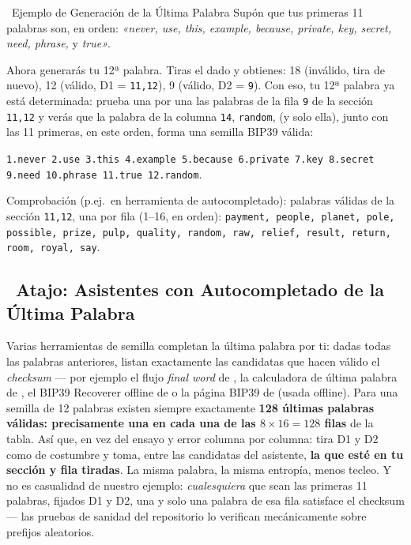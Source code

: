 \documentclass[10pt]{article}
\begin{document}
\begin{examplebox}{\faLightbulb~Ejemplo de Generación de la Última Palabra}
Supón que tus primeras 11 palabras son, en orden: \textit{«never, use, this, example, because, private, key, secret, need, phrase,} y \textit{true»}.

Ahora generarás tu 12ª palabra. Tiras el dado y obtienes: 18 (inválido, tira de nuevo), 12 (válido, D1 = \texttt{11,12}), 9 (válido, D2 = \texttt{9}). Con eso, tu 12ª palabra ya está determinada: prueba una por una las palabras de la fila \texttt{9} de la sección \texttt{11,12} y verás que la palabra de la columna \texttt{14}, \texttt{random}, (y solo ella), junto con las 11 primeras, en este orden, forma una semilla BIP39 válida:

\vspace{0.5em}
\texttt{1.never 2.use 3.this 4.example 5.because 6.private 7.key 8.secret 9.need 10.phrase 11.true 12.random}. \faCheckCircle
\vspace{0.25em}

{\scriptsize Comprobación (p.ej.\ en herramienta de autocompletado): palabras válidas de la sección \texttt{11,12}, una por fila (1--16, en orden): \texttt{payment, people, planet, pole, possible, prize, pulp, quality, random, raw, relief, result, return, room, royal, say}.\par}
\end{examplebox}

\subsection*{\faMagic~Atajo: Asistentes con Autocompletado de la Última Palabra}

Varias herramientas de semilla completan la última palabra por ti: dadas todas las palabras anteriores, listan exactamente las candidatas que hacen válido el \textit{checksum} --- por ejemplo el flujo \textit{final word} de \seedsignerlink{}, la calculadora de última palabra de \seedpickerlink{}, el BIP39 Recoverer offline de \coinplatelink{} o la página BIP39 de \iancolemanlink{} (usada offline). Para una semilla de 12 palabras existen siempre exactamente \textbf{128 últimas palabras válidas: precisamente una en cada una de las $8\times16=128$ filas} de la tabla. Así que, en vez del ensayo y error columna por columna: tira D1 y D2 como de costumbre y toma, entre las candidatas del asistente, \textbf{la que esté en tu sección y fila tiradas}. La misma palabra, la misma entropía, menos tecleo. Y no es casualidad de nuestro ejemplo: \emph{cualesquiera} que sean las primeras 11 palabras, fijados D1 y D2, una y solo una palabra de esa fila satisface el checksum --- las pruebas de sanidad del repositorio lo verifican mecánicamente sobre prefijos aleatorios.
\end{document}
